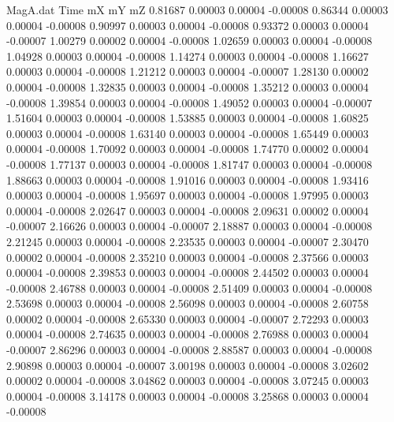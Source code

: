 \begin{filecontents}{MagA.dat}
Time mX mY mZ
   0.81687    0.00003    0.00004   -0.00008
   0.86344    0.00003    0.00004   -0.00008
   0.90997    0.00003    0.00004   -0.00008
   0.93372    0.00003    0.00004   -0.00007
   1.00279    0.00002    0.00004   -0.00008
   1.02659    0.00003    0.00004   -0.00008
   1.04928    0.00003    0.00004   -0.00008
   1.14274    0.00003    0.00004   -0.00008
   1.16627    0.00003    0.00004   -0.00008
   1.21212    0.00003    0.00004   -0.00007
   1.28130    0.00002    0.00004   -0.00008
   1.32835    0.00003    0.00004   -0.00008
   1.35212    0.00003    0.00004   -0.00008
   1.39854    0.00003    0.00004   -0.00008
   1.49052    0.00003    0.00004   -0.00007
   1.51604    0.00003    0.00004   -0.00008
   1.53885    0.00003    0.00004   -0.00008
   1.60825    0.00003    0.00004   -0.00008
   1.63140    0.00003    0.00004   -0.00008
   1.65449    0.00003    0.00004   -0.00008
   1.70092    0.00003    0.00004   -0.00008
   1.74770    0.00002    0.00004   -0.00008
   1.77137    0.00003    0.00004   -0.00008
   1.81747    0.00003    0.00004   -0.00008
   1.88663    0.00003    0.00004   -0.00008
   1.91016    0.00003    0.00004   -0.00008
   1.93416    0.00003    0.00004   -0.00008
   1.95697    0.00003    0.00004   -0.00008
   1.97995    0.00003    0.00004   -0.00008
   2.02647    0.00003    0.00004   -0.00008
   2.09631    0.00002    0.00004   -0.00007
   2.16626    0.00003    0.00004   -0.00007
   2.18887    0.00003    0.00004   -0.00008
   2.21245    0.00003    0.00004   -0.00008
   2.23535    0.00003    0.00004   -0.00007
   2.30470    0.00002    0.00004   -0.00008
   2.35210    0.00003    0.00004   -0.00008
   2.37566    0.00003    0.00004   -0.00008
   2.39853    0.00003    0.00004   -0.00008
   2.44502    0.00003    0.00004   -0.00008
   2.46788    0.00003    0.00004   -0.00008
   2.51409    0.00003    0.00004   -0.00008
   2.53698    0.00003    0.00004   -0.00008
   2.56098    0.00003    0.00004   -0.00008
   2.60758    0.00002    0.00004   -0.00008
   2.65330    0.00003    0.00004   -0.00007
   2.72293    0.00003    0.00004   -0.00008
   2.74635    0.00003    0.00004   -0.00008
   2.76988    0.00003    0.00004   -0.00007
   2.86296    0.00003    0.00004   -0.00008
   2.88587    0.00003    0.00004   -0.00008
   2.90898    0.00003    0.00004   -0.00007
   3.00198    0.00003    0.00004   -0.00008
   3.02602    0.00002    0.00004   -0.00008
   3.04862    0.00003    0.00004   -0.00008
   3.07245    0.00003    0.00004   -0.00008
   3.14178    0.00003    0.00004   -0.00008
   3.25868    0.00003    0.00004   -0.00008

\end{filecontents}

